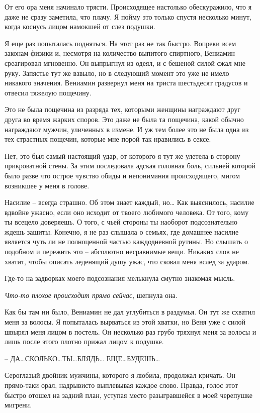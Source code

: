 \documentclass[
]{book}
\begin{document}
От его ора меня начинало трясти. Происходящее настолько обескуражило, что я даже не сразу заметила, что плачу. Я пойму это только спустя несколько минут, когда коснусь лицом намокшей от слез подушки.

Я еще раз попыталась подняться. На этот раз не так быстро. Вопреки всем законам физики и, несмотря на количество выпитого спиртного, Вениамин среагировал мгновенно. Он выпрыгнул из одеял, и с бешеной силой сжал мне руку. Запястье тут же взвыло, но в следующий момент это уже не имело никакого значения. Вениамин развернул меня на триста шестьдесят градусов и отвесил тяжелую пощечину.

Это не была пощечина из разряда тех, которыми женщины награждают друг друга во время жарких споров. Это даже не была та пощечина, какой обычно награждают мужчин, уличенных в измене. И уж тем более это не была одна из тех страстных пощечин, которые мне порой так нравились в сексе.

Нет, это был самый настоящий удар, от которого я тут же улетела в сторону прикроватной стены. За этим последовала адская головная боль, сильней которой было разве что острое чувство обиды и непонимания происходящего, мигом возникшее у меня в голове.

Насилие -- всегда страшно. Об этом знает каждый, но\ldots{} Как выяснилось, насилие вдвойне ужасно, если оно исходит от твоего любимого человека. От того, кому ты всецело доверяешь. О того, с чьей стороны ты наоборот подсознательно ждешь защиты. Конечно, я не раз слышала о семьях, где домашнее насилие является чуть ли не полноценной частью каждодневной рутины. Но слышать о подобном и пережить это -- абсолютно несравнимые вещи. Никаких слов не хватит, чтобы описать леденящий душу ужас, что сковал меня вслед за ударом.

Где-то на задворках моего подсознания мелькнула смутно знакомая мысль.

\emph{Что-то плохое происходит прямо сейчас}, шепнула она.

Как бы там ни было, Вениамин не дал углубиться в раздумья. Он тут же схватил меня за волосы. Я попыталась вырваться из этой хватки, но Веня уже с силой швырял меня лицом в постель. Он несколько раз грубо тряхнул меня за волосы и лишь после этого плотно прижал лицом к подушке.

-- ДА\ldots СКОЛЬКО\ldots ТЫ\ldots БЛЯДЬ\ldots{} ЕЩЕ\ldots БУДЕШЬ\ldots{}

Сероглазый двойник мужчины, которого я любила, продолжал кричать. Он прямо-таки орал, надрывисто выплевывая каждое слово. Правда, голос этот быстро отошел на задний план, уступая место разыгравшейся в моей черепушке мигрени.
\end{document}
